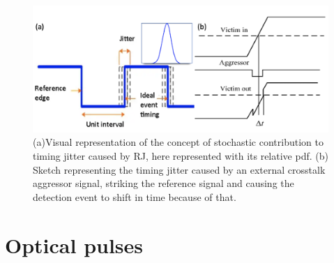 \begin{figure}[hbtp]
\centering
\includegraphics[width=1\textwidth]{RandomCrosstalk}
\caption{(a)Visual representation of the concept of stochastic contribution to timing jitter caused by RJ, here represented with its relative pdf.
(b) Sketch representing the timing jitter caused by an external crosstalk aggressor signal, striking the reference signal and causing the detection event to shift in time because of that.}
\label{RandomIMG}
\end{figure}


\section{Optical pulses}
\label{sec:Def-Pulses}

